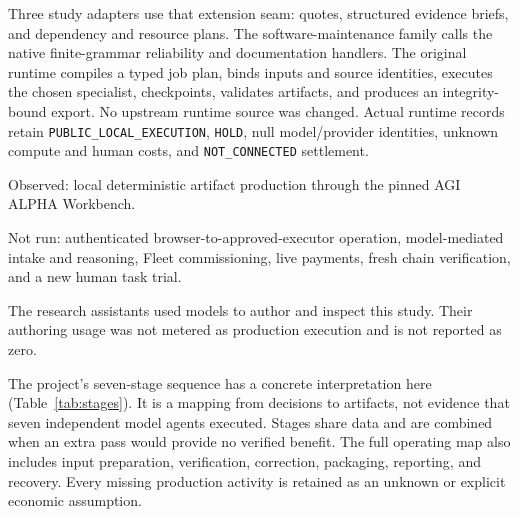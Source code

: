 Three study adapters use that extension seam: quotes, structured evidence briefs, and dependency and resource plans. The software-maintenance family calls the native finite-grammar reliability and documentation handlers. The original runtime compiles a typed job plan, binds inputs and source identities, executes the chosen specialist, checkpoints, validates artifacts, and produces an integrity-bound export. No upstream runtime source was changed. Actual runtime records retain \texttt{PUBLIC\_LOCAL\_EXECUTION}, \texttt{HOLD}, null model/provider identities, unknown compute and human costs, and \texttt{NOT\_CONNECTED} settlement.

\begin{tcolorbox}[colback=lavender,colframe=purple,title={The scope of execution}]
Observed: local deterministic artifact production through the pinned AGI ALPHA Workbench.\par
Not run: authenticated browser-to-approved-executor operation, model-mediated intake and reasoning, Fleet commissioning, live payments, fresh chain verification, and a new human task trial.\par
The research assistants used models to author and inspect this study. Their authoring usage was not metered as production execution and is not reported as zero.
\end{tcolorbox}

The project's seven-stage sequence has a concrete interpretation here (Table~\ref{tab:stages}). It is a mapping from decisions to artifacts, not evidence that seven independent model agents executed. Stages share data and are combined when an extra pass would provide no verified benefit. The full operating map also includes input preparation, verification, correction, packaging, reporting, and recovery. Every missing production activity is retained as an unknown or explicit economic assumption.

